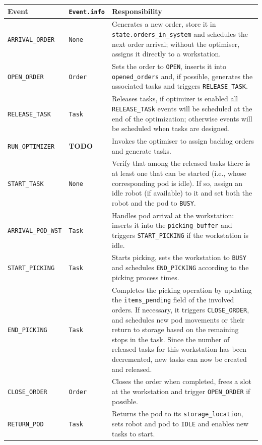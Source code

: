 \documentclass[a4paper,10pt]{article}
\newcommand{\todo}{\textcolor{todored}{\bfseries TODO}}
\begin{document}
\begin{table}[htbp]
\begin{tabularx}{\textwidth}{p{3cm} p{4cm} X}
\toprule
\textbf{Event} & \textbf{\texttt{Event.info}} & \textbf{Responsibility} \\
\midrule
\texttt{ARRIVAL\_ORDER}    
& \texttt{None} 
& Generates a new order, store it in \texttt{state.orders\_in\_system} and schedules the next order arrival; without the optimiser, assigns it directly to a workstation. \\

\texttt{OPEN\_ORDER}       
& \texttt{Order} 
& Sets the order to \texttt{OPEN}, inserts it into \texttt{opened\_orders} and, if possible, generates the associated tasks and triggers \texttt{RELEASE\_TASK}. \\

\texttt{RELEASE\_TASK}     
& \texttt{Task}
& Releases tasks, if optimizer is enabled all \texttt{RELEASE\_TASk} events will be scheduled at the end of the optimization; otherwise events will be scheduled when tasks are designed. \\

\texttt{RUN\_OPTIMIZER}    
& \todo 
& Invokes the optimiser to assign backlog orders and generate tasks. \\

\texttt{START\_TASK}       
& \texttt{None} 
& Verify that among the released tasks there is at least one that can be started (i.e., whose corresponding pod is idle). If so, assign an idle robot (if available) to it and set both the robot and the pod to \texttt{BUSY}. \\

\texttt{ARRIVAL\_POD\_WST} 
& \texttt{Task} 
& Handles pod arrival at the workstation: inserts it into the \texttt{picking\_buffer} and triggers \texttt{START\_PICKING} if the workstation is idle. \\

\texttt{START\_PICKING}    
& \texttt{Task} 
& Starts picking, sets the workstation to \texttt{BUSY} and schedules \texttt{END\_PICKING} according to the picking process times. \\

\texttt{END\_PICKING}      
& \texttt{Task} 
& Completes the picking operation by updating the \texttt{items\_pending} field of the involved orders. If necessary, it triggers \texttt{CLOSE\_ORDER}, and schedules new pod movements or their return to storage based on the remaining stops in the task. Since the number of released tasks for this workstation has been decremented, new tasks can now be created and released.\\

\texttt{CLOSE\_ORDER}      
& \texttt{Order} 
& Closes the order when completed, frees a slot at the workstation and trigger \texttt{OPEN\_ORDER} if possible. \\

\texttt{RETURN\_POD}       
& \texttt{Task} 
& Returns the pod to its \texttt{storage\_location}, sets robot and pod to \texttt{IDLE} and enables new tasks to start. \\
\bottomrule
\end{tabularx}
\end{table}
\end{document}
